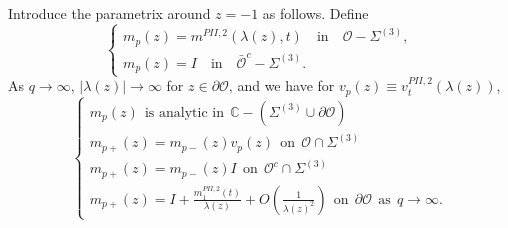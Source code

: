 \documentclass{amsart}
\theoremstyle{definition}
\theoremstyle{remark}
\numberwithin{equation}{section}
\newcommand{\C}{\mathbb C}
\begin{document}
Introduce the parametrix around $z=-1$ as follows.
Define 
\begin{equation*}
  \begin{cases}
    m_p(z)=m^{PII,2}(\lambda(z),t) \quad
\text{in}\quad\mathcal{O}-\Sigma^{(3)}, \\
    m_p(z)=I \quad\text{in}\quad\mathcal{\bar{O}}^c-\Sigma^{(3)}.
  \end{cases}
\end{equation*}
As $q\to\infty$, $|\lambda(z)|\to\infty$ for $z\in\partial\mathcal{O}$,  
and we have for $v_p(z)\equiv v_t^{PII,2}(\lambda(z))$, 
\begin{equation}
 \begin{cases}
   m_p(z) \ \ \text{is analytic in} \ \ 
\C-(\Sigma^{(3)}\cup\partial\mathcal{O})\\
   m_{p+}(z)=m_{p-}(z)v_p(z) \ \ 
\text{on} \ \ \mathcal{O}\cap\Sigma^{(3)}\\
   m_{p+}(z)=m_{p-}(z)I \ \ \text{on} \ \ \mathcal{O}^c\cap\Sigma^{(3)}\\
   m_{p+}(z)=I+\frac{m^{PII,2}_{1}(t)}{\lambda(z)}+O(\frac{1}{\lambda(z)^2}) 
\ \ \text{on} \ \ \partial\mathcal{O} \ \  
\text{as} \ \ q\rightarrow\infty.
 \end{cases}
\end{equation}
\end{document}
